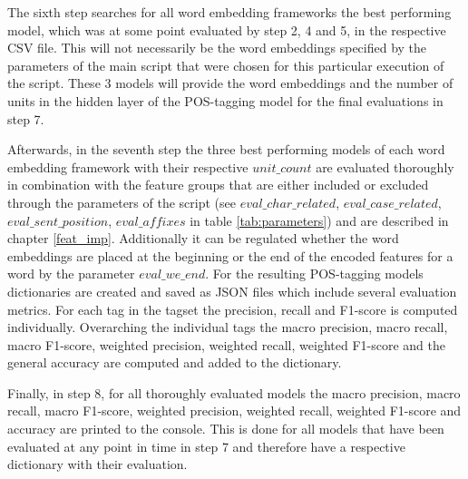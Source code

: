 The sixth step searches for all word embedding frameworks the best performing model, which was at some point evaluated by step 2, 4 and 5, in the respective CSV file. This will not necessarily be the word embeddings specified by the parameters of the main script that were chosen for this particular execution of the script. These 3 models will provide the word embeddings and the number of units in the hidden layer of the POS-tagging model for the final evaluations in step 7.

Afterwards, in the seventh step the three best performing models of each word embedding framework with their respective $unit\_count$ are evaluated thoroughly in combination with the feature groups that are either included or excluded through the parameters of the script (see $eval\_char\_related$, $eval\_case\_related$, $eval\_sent\_position$, $eval\_affixes$ in table \ref{tab:parameters}) and are described in chapter \ref{feat_imp}. Additionally it can be regulated whether the word embeddings are placed at the beginning or the end of the encoded features for a word by the parameter $eval\_we\_end$.
For the resulting POS-tagging models dictionaries are created and saved as JSON files which include several evaluation metrics. For each tag in the tagset the precision, recall and F1-score is computed individually. Overarching the individual tags the macro precision, macro recall, macro F1-score, weighted precision, weighted recall, weighted F1-score and the general accuracy are computed and added to the dictionary.

Finally, in step 8, for all thoroughly evaluated models the macro precision, macro recall, macro F1-score, weighted precision, weighted recall, weighted F1-score and accuracy are printed to the console. This is done for all models that have been evaluated at any point in time in step 7 and therefore have a respective dictionary with their evaluation.

\newcommand*{\thead}[1]{\multicolumn{1}{c}{\bfseries #1}}

